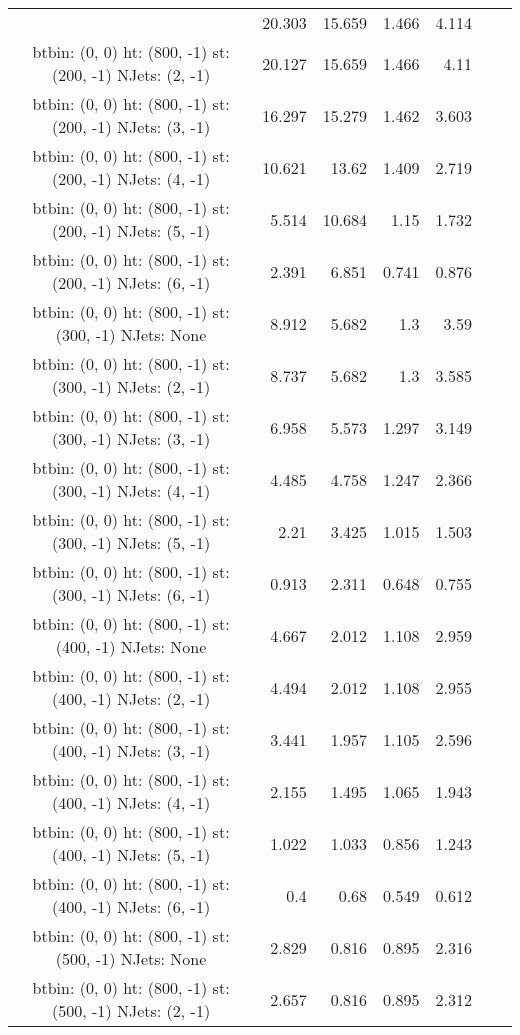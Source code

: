 \documentclass[12pt]{paper}
\begin{document}
\begin{landscape}
\begin{longtable}{c|r|r|r|r|r|r}
 & 20.303 & 15.659 & 1.466 & 4.114\\
btbin:  (0, 0) ht:  (800, -1) st:  (200, -1) NJets:  (2, -1)
 & 20.127 & 15.659 & 1.466 & 4.11\\
btbin:  (0, 0) ht:  (800, -1) st:  (200, -1) NJets:  (3, -1)
 & 16.297 & 15.279 & 1.462 & 3.603\\
btbin:  (0, 0) ht:  (800, -1) st:  (200, -1) NJets:  (4, -1)
 & 10.621 & 13.62 & 1.409 & 2.719\\
btbin:  (0, 0) ht:  (800, -1) st:  (200, -1) NJets:  (5, -1)
 & 5.514 & 10.684 & 1.15 & 1.732\\
btbin:  (0, 0) ht:  (800, -1) st:  (200, -1) NJets:  (6, -1)
 & 2.391 & 6.851 & 0.741 & 0.876\\
btbin:  (0, 0) ht:  (800, -1) st:  (300, -1) NJets:  None
 & 8.912 & 5.682 & 1.3 & 3.59\\
btbin:  (0, 0) ht:  (800, -1) st:  (300, -1) NJets:  (2, -1)
 & 8.737 & 5.682 & 1.3 & 3.585\\
btbin:  (0, 0) ht:  (800, -1) st:  (300, -1) NJets:  (3, -1)
 & 6.958 & 5.573 & 1.297 & 3.149\\
btbin:  (0, 0) ht:  (800, -1) st:  (300, -1) NJets:  (4, -1)
 & 4.485 & 4.758 & 1.247 & 2.366\\
btbin:  (0, 0) ht:  (800, -1) st:  (300, -1) NJets:  (5, -1)
 & 2.21 & 3.425 & 1.015 & 1.503\\
btbin:  (0, 0) ht:  (800, -1) st:  (300, -1) NJets:  (6, -1)
 & 0.913 & 2.311 & 0.648 & 0.755\\
btbin:  (0, 0) ht:  (800, -1) st:  (400, -1) NJets:  None
 & 4.667 & 2.012 & 1.108 & 2.959\\
btbin:  (0, 0) ht:  (800, -1) st:  (400, -1) NJets:  (2, -1)
 & 4.494 & 2.012 & 1.108 & 2.955\\
btbin:  (0, 0) ht:  (800, -1) st:  (400, -1) NJets:  (3, -1)
 & 3.441 & 1.957 & 1.105 & 2.596\\
btbin:  (0, 0) ht:  (800, -1) st:  (400, -1) NJets:  (4, -1)
 & 2.155 & 1.495 & 1.065 & 1.943\\
btbin:  (0, 0) ht:  (800, -1) st:  (400, -1) NJets:  (5, -1)
 & 1.022 & 1.033 & 0.856 & 1.243\\
btbin:  (0, 0) ht:  (800, -1) st:  (400, -1) NJets:  (6, -1)
 & 0.4 & 0.68 & 0.549 & 0.612\\
btbin:  (0, 0) ht:  (800, -1) st:  (500, -1) NJets:  None
 & 2.829 & 0.816 & 0.895 & 2.316\\
btbin:  (0, 0) ht:  (800, -1) st:  (500, -1) NJets:  (2, -1)
 & 2.657 & 0.816 & 0.895 & 2.312\\

\end{longtable}
\end{landscape}
\end{document}
